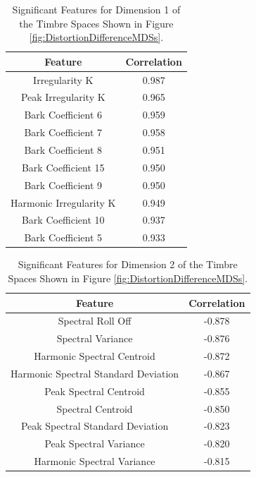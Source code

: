		\begin{table}[h!]
			\centering
			\begin{tabular}{|c|c|}
				\hline
				\bf{Feature} & \bf{Correlation} \\
				\hline
				\hline
				Irregularity K & 0.987 \\
				\hline
				Peak Irregularity K & 0.965 \\
				\hline
				Bark Coefficient 6 & 0.959 \\
				\hline
				Bark Coefficient 7 & 0.958 \\
				\hline
				Bark Coefficient 8 & 0.951 \\
				\hline
				Bark Coefficient 15 & 0.950 \\
				\hline
				Bark Coefficient 9 & 0.950 \\
				\hline
				Harmonic Irregularity K & 0.949 \\
				\hline
				Bark Coefficient 10 & 0.937 \\
				\hline
				Bark Coefficient 5 & 0.933 \\
				\hline
			\end{tabular}
			\caption{Significant Features for Dimension 1 of the Timbre Spaces Shown in Figure 
				 \ref{fig:DistortionDifferenceMDSs}.}
			\label{tab:DistortionDifferenceFeatures}
		\end{table}

		\begin{table}[h!]
			\centering
			\begin{tabular}{|c|c|}
				\hline
				\bf{Feature} & \bf{Correlation} \\
				\hline
				\hline
				Spectral Roll Off & -0.878 \\
				\hline
				Spectral Variance & -0.876 \\
				\hline
				Harmonic Spectral Centroid & -0.872 \\
				\hline
				Harmonic Spectral Standard Deviation & -0.867 \\
				\hline
				Peak Spectral Centroid & -0.855 \\
				\hline
				Spectral Centroid & -0.850 \\
				\hline
				Peak Spectral Standard Deviation & -0.823 \\
				\hline
				Peak Spectral Variance & -0.820 \\
				\hline
				Harmonic Spectral Variance & -0.815 \\
				\hline
			\end{tabular}
			\caption{Significant Features for Dimension 2 of the Timbre Spaces Shown in Figure 
				 \ref{fig:DistortionDifferenceMDSs}.}
			\label{tab:DistortionDifferenceFeatures}
		\end{table}


